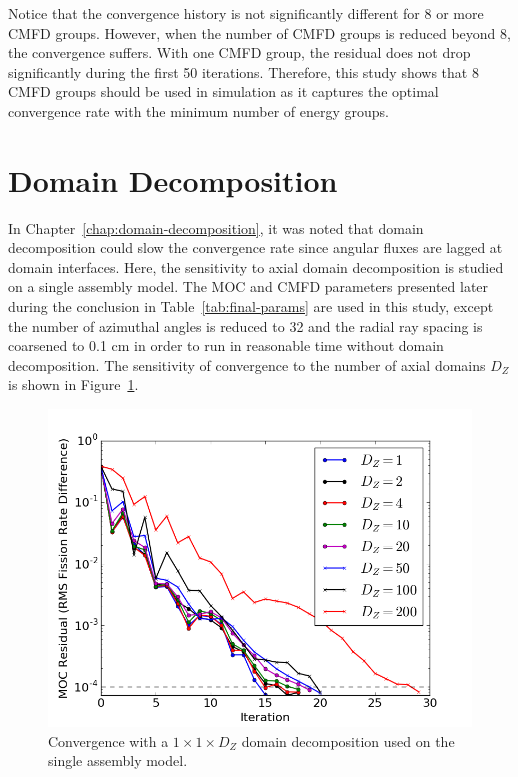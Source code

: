 Notice that the convergence history is not significantly different for 8 or more \ac{CMFD} groups. However, when the number of \ac{CMFD} groups is reduced beyond 8, the convergence suffers. With one \ac{CMFD} group, the residual does not drop significantly during the first 50 iterations. Therefore, this study shows that 8 \ac{CMFD} groups should be used in simulation as it captures the optimal convergence rate with the minimum number of energy groups.

\section{Domain Decomposition}
\label{sec:domain-decomposition-convergence}

In Chapter~\ref{chap:domain-decomposition}, it was noted that domain decomposition could slow the convergence rate since angular fluxes are lagged at domain interfaces. Here, the sensitivity to axial domain decomposition is studied on a single assembly model. The \ac{MOC} and \ac{CMFD} parameters presented later during the conclusion in Table~\ref{tab:final-params} are used in this study, except the number of azimuthal angles is reduced to 32 and the radial ray spacing is coarsened to 0.1 cm in order to run in reasonable time without domain decomposition. The sensitivity of convergence to the number of axial domains $D_Z$ is shown in Figure~\ref{fig:axial-dd}.

\begin{figure}[h!]
	\centering
	\includegraphics[width=0.9\linewidth]{figures/results/sensitivity/domains_z.png}
	\caption[]{Convergence with a $1 \times 1 \times D_Z$ domain decomposition used on the single assembly model.}
	\label{fig:axial-dd}
\end{figure}

